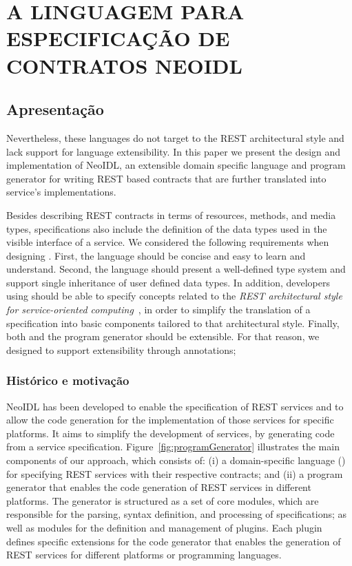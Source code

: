 \chapter{A LINGUAGEM PARA ESPECIFICAÇÃO DE CONTRATOS NEOIDL}
\vspace{-6mm}


\section{Apresentação}

Nevertheless, these languages do not target
to the REST architectural style and 
lack support for language extensibility. In this paper we present the design and implementation of 
NeoIDL, an extensible domain specific language and program generator for writing REST based
contracts that are further translated into service's implementations.

Besides describing REST contracts in terms of resources,
methods, and media types, \neoidl{} specifications also include the
definition of the data types used in the visible interface of a service. 
We considered the following requirements when designing \neoidl.
First, the language should be concise and easy to learn and
understand.
Second, the language should present a well-defined type system
and support single inheritance of user defined data types. In
addition, developers using \neoidl{} should be able to specify
concepts related to the \emph{REST architectural style for service-oriented
  computing}~\cite{fielding-rest:2002}, in order to simplify the translation of a \neoidl{}
specification into basic components tailored to that architectural style. Finally,
both \neoidl{} and the program generator should be extensible. For
that reason, we designed \neoidl{} to support extensibility 
through annotations;

\subsection{Histórico e motivação}
\vspace{-6mm}


NeoIDL has been developed to enable the specification of REST 
services and to allow the code generation for the implementation 
of those services for specific platforms.
It aims to simplify the development of
services, by generating code from a
service specification. Figure~\ref{fig:programGenerator} illustrates
the main components of our approach, which consists
of: (i) a domain-specific language (\neoidl)
for specifying REST services with their respective
contracts; and (ii) a
program generator that enables the code generation of REST services
in different platforms. 
The \neoidl{} generator is structured as a set of
core modules, which are responsible for the parsing,
syntax definition, and processing of \neoidl{} specifications;
as well as modules for the definition and
management of \neoidl{} plugins. Each \neoidl{} plugin
defines specific extensions for the code generator
that enables the generation of REST services for different platforms
or programming languages.

